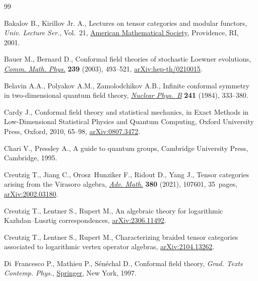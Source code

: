 \documentclass[10pt,a4paper]{amsart}
\numberwithin{equation}{section}
\begin{document}
\begin{thebibliography}{99}
\footnotesize\itemsep=0pt

Bakalov B., Kirillov Jr. A., Lectures on tensor categories and modular
 functors, \textit{Univ. Lecture Ser.}, Vol.~21,
 \href{https://doi.org/10.1090/ulect/021}{American Mathematical Society},
 Providence, RI, 2001.

Bauer M., Bernard D., Conformal field theories of stochastic {L}oewner
 evolutions, \href{https://doi.org/10.1007/s00220-003-0881-x}{\textit{Comm.
 Math. Phys.}} \textbf{239} (2003), 493--521,
 \href{http://arxiv.org/abs/hep-th/0210015}{arXiv:hep-th/0210015}.

Belavin A.A., Polyakov A.M., Zamolodchikov A.B., Infinite conformal symmetry in
 two-dimensional quantum field theory,
 \href{https://doi.org/10.1016/0550-3213(84)90052-X}{\textit{Nuclear Phys.~B}}
 \textbf{241} (1984), 333--380.

Cardy J., Conformal field theory and statistical mechanics, in Exact {M}ethods
 in {L}ow-{D}imensional {S}tatistical {P}hysics and {Q}uantum {C}omputing,
 Oxford University Press, Oxford, 2010, 65--98,
 \href{http://arxiv.org/abs/0807.3472}{arXiv:0807.3472}.

Chari V., Pressley A., A guide to quantum groups, Cambridge University Press,
 Cambridge, 1995.

Creutzig T., Jiang C., Orosz~Hunziker F., Ridout D., Yang J., Tensor categories
 arising from the {V}irasoro algebra,
 \href{https://doi.org/10.1016/j.aim.2021.107601}{\textit{Adv. Math.}}
 \textbf{380} (2021), 107601, 35~pages,
 \href{http://arxiv.org/abs/2002.03180}{arXiv:2002.03180}.

Creutzig T., Lentner S., Rupert M., An algebraic theory for logarithmic
 {K}azhdan--{L}usztig correspondences,
 \href{http://arxiv.org/abs/2306.11492}{arXiv:2306.11492}.

Creutzig T., Lentner S., Rupert M., Characterizing braided tensor categories
 associated to logarithmic vertex operator algebras,
 \href{http://arxiv.org/abs/2104.13262}{arXiv:2104.13262}.

Di~Francesco P., Mathieu P., S\'en\'echal D., Conformal field theory, \textit{Grad. Texts Contemp. Phys.},
 \href{https://doi.org/10.1007/978-1-4612-2256-9}{Springer}, New York, 1997.


\end{thebibliography}
\end{document}
